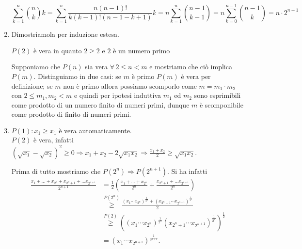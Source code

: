 \documentclass[a4paper]{article}\par \usepackage{style}\par
\begin{document}
\begin{enumerate}
  \[\sum_{k = 1}^{n} \binom{n}{k} k = \sum_{k = 1}^{n} \frac{n (n - 1)!}{k (k - 1)! (n - 1 - k + 1)} k = n \sum_{k = 1}^{n} \binom{n - 1}{k - 1} = n \sum_{k = 0}^{n - 1} \binom{n - 1}{k} = n \cdot 2^{n - 1}\]
\item Dimostriamola per induzione estesa.
  \begin{pbase}
    $ P(2) $ è vera in quanto $ 2 \geq 2 $ e $ 2 $ è un numero primo
  \end{pbase}
  \begin{pind}
    Supponiamo che $ P(n) $ sia vera $ \forall \, 2 \leq n < m $ e mostriamo che ciò implica $ P(m) $. Distinguiamo in due casi: se $ m $ è primo $ P(m) $ è vera per definizione; se $ m $ non è primo allora possiamo scomporlo come $ m = m_1 \cdot m_2 $ con $ 2 \leq m_1, m_2 < m $ e quindi per ipotesi induttiva $ m_1 $ ed $ m_2 $ sono esprimibili come prodotto di un numero finito di numeri primi, dunque $ m $ è scomponibile come prodotto di finito di numeri primi.
  \end{pind}
\item \begin{pbase}
    $ P(1) : x_1 \geq x_1 $ è vera automaticamente. \\
    $ P(2) $ è vera, infatti $ (\sqrt{x_1} - \sqrt{x_2})^2 \geq 0 \Rightarrow x_1 + x_2 - 2 \sqrt{x_1 x_2} \Rightarrow \frac{x_1 + x_2}{2} \geq \sqrt{x_1 x_2} $.
  \end{pbase}
  \begin{pind}
    Prima di tutto mostriamo che $ P(2^{n}) \Rightarrow P(2^{n + 1}) $. Si ha infatti
    \begin{align*}
      \frac{x_1 + \dots + x_{2^{n}} + x_{2^{n} + 1} + \dots x_{2^{n + 1}}}{2^{n + 1}} & = \frac{1}{2}\left(\frac{x_1 + \dots + x_{2^{n}}}{2^{n}} + \frac{x_{2^{n} + 1} + \dots x_{2^{n + 1}}}{2^{n}} \right) \\
                                                                                      & \overset{P(2^{n})}{\geq} \frac{(x_1 \cdots x_{2^{n}})^\frac{1}{2^{n}} + (x_{2^n + 1} \cdots x_{2^{n + 1}})^\frac{1}{2^{n}}}{2} \\
                                                                                      & \overset{P(2)}{\geq} \left((x_1 \cdots x_{2^{n}})^\frac{1}{2^{n}} (x_{2^n + 1} \cdots x_{2^{n + 1}})^\frac{1}{2^{n}}\right)^\frac{1}{2} \\
                                                                                      & = (x_1 \cdots x_{2^{n + 1}})^\frac{1}{2^{n + 1}}.
    \end{align*}

\end{pind}
\end{enumerate}
\end{document}
